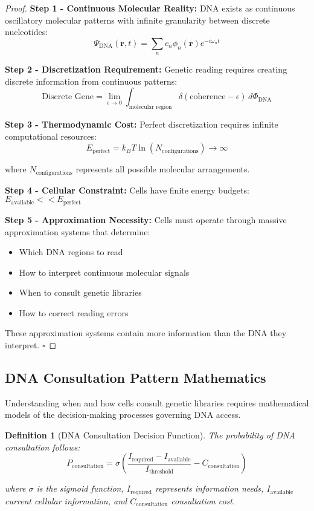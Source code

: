 \documentclass[12pt,a4paper]{article}
\newtheorem{definition}[theorem]{Definition}
\begin{document}
\begin{proof}
\textbf{Step 1 - Continuous Molecular Reality:}
DNA exists as continuous oscillatory molecular patterns with infinite granularity between discrete nucleotides:
$$\Psi_{\text{DNA}}(\mathbf{r},t) = \sum_{n} c_n \phi_n(\mathbf{r}) e^{-iω_n t}$$

\textbf{Step 2 - Discretization Requirement:}
Genetic reading requires creating discrete information from continuous patterns:
$$\text{Discrete Gene} = \lim_{\epsilon \to 0} \int_{\text{molecular region}} δ(\text{coherence} - \epsilon) \, d\Phi_{\text{DNA}}$$

\textbf{Step 3 - Thermodynamic Cost:}
Perfect discretization requires infinite computational resources:
$$E_{\text{perfect}} = k_B T \ln(N_{\text{configurations}}) \to \infty$$

where $N_{\text{configurations}}$ represents all possible molecular arrangements.

\textbf{Step 4 - Cellular Constraint:}
Cells have finite energy budgets: $E_{\text{available}} << E_{\text{perfect}}$

\textbf{Step 5 - Approximation Necessity:}
Cells must operate through massive approximation systems that determine:
\begin{itemize}
\item Which DNA regions to read
\item How to interpret continuous molecular signals  
\item When to consult genetic libraries
\item How to correct reading errors
\end{itemize}

These approximation systems contain more information than the DNA they interpret. $\square$
\end{proof}

\subsection{DNA Consultation Pattern Mathematics}

Understanding when and how cells consult genetic libraries requires mathematical models of the decision-making processes governing DNA access.

\begin{definition}[DNA Consultation Decision Function]
The probability of DNA consultation follows:
$$P_{\text{consultation}} = \sigma\left(\frac{I_{\text{required}} - I_{\text{available}}}{I_{\text{threshold}}} - C_{\text{consultation}}\right)$$

where $\sigma$ is the sigmoid function, $I_{\text{required}}$ represents information needs, $I_{\text{available}}$ current cellular information, and $C_{\text{consultation}}$ consultation cost.
\end{definition}
\end{document}
